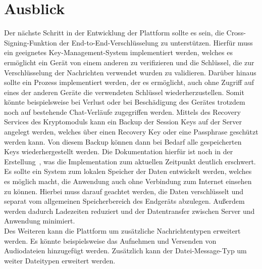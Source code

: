    \chapter{Ausblick}\label{ch:ausblick}
    Der nächste Schritt in der Entwicklung der Plattform sollte es sein, die Cross-Signing-Funktion der End-to-End-Verschlüsselung zu unterstützen.
    Hierfür muss ein geeignetes Key-Management-System implementiert werden, welches es ermöglicht ein Gerät von einem anderen zu verifizieren und die Schlüssel, die zur Verschlüsselung der Nachrichten verwendet wurden zu validieren.
    Darüber hinaus sollte ein Prozess implementiert werden, der es ermöglicht, auch ohne Zugriff auf eines der anderen Geräte die verwendeten Schlüssel wiederherzustellen.
    Somit könnte beispielsweise bei Verlust oder bei Beschädigung des Gerätes trotzdem noch auf bestehende Chat-Verläufe zugegriffen werden.
    Mittels des Recovery Services des Kryptomoduls kann ein Backup der Session Keys auf der Server angelegt werden, welches über einen Recovery Key oder eine Passphrase geschützt werden kann.
    Von diesem Backup können dann bei Bedarf alle gespeicherten Keys wiederhergestellt werden.
    Die Dokumentation hierfür ist noch in der Erstellung~\cite{advancede2e}, was die Implementation zum aktuellen Zeitpunkt deutlich erschwert.\\
    Es sollte ein System zum lokalen Speicher der Daten entwickelt werden, welches es möglich macht, die Anwendung auch ohne Verbindung zum Internet einsehen zu können.
    Hierbei muss darauf geachtet werden, die Daten verschlüsselt und separat vom allgemeinen Speicherbereich des Endgeräts abzulegen.
    Außerdem werden dadurch Ladezeiten reduziert und der Datentransfer zwischen Server und Anwendung minimiert.\\
    Des Weiteren kann die Plattform um zusätzliche Nachrichtentypen erweitert werden.
    Es könnte beispielsweise das Aufnehmen und Versenden von Audiodateien hinzugefügt werden.
    Zusätzlich kann der Datei-Message-Typ um weiter Dateitypen erweitert werden.

%

